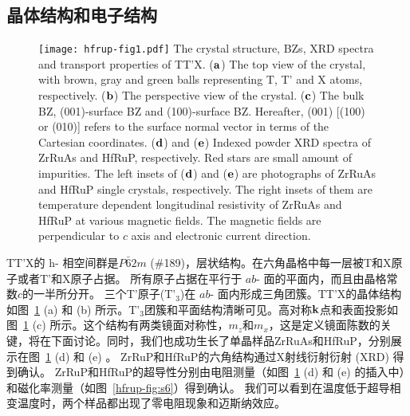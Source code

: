 \subsection{晶体结构和电子结构}
\begin{figure}[!htbp]
    \centering
    \texttt{[image: hfrup-fig1.pdf]}
     {The crystal structure, BZs, XRD spectra and transport properties of TT'X.
      ($\bold a$) The top view of the crystal, with brown, gray and green balls representing T, T' and X atoms, respectively.
      ($\bold b$) The perspective view of the crystal. 
      ($\bold c$) The bulk BZ, (001)-surface BZ and (100)-surface BZ. Hereafter, (001) [(100) or (010)] refers to the surface normal vector in terms of the Cartesian coordinates.
      ($\bold d$) and ($\bold e$) Indexed powder XRD spectra of ZrRuAs and HfRuP, respectively. Red stars are small amount of impurities. The left insets of ($\bold d$) and ($\bold e$) are photographs of ZrRuAs and HfRuP single crystals, respectively.  The right insets of them are temperature dependent longitudinal resistivity of ZrRuAs and HfRuP at various magnetic fields. The magnetic fields are perpendicular to $c$ axis and electronic current direction. ~\citep{qian2019npj}
      }
      \label{fig:4-1}
\end{figure}


TT'X的 h- 相空间群是$P\bar 6 2m$ (\#189)，层状结构。在六角晶格中每一层被T和X原子或者T'和X原子占据。
所有原子占据在平行于 $ab$- 面的平面内，而且由晶格常数$c$的一半所分开。
三个T'原子(T'$_3$)在 $ab$- 面内形成三角团簇。TT'X的晶体结构如图~\ref{fig:4-1} (a) 和 (b) 所示。T'$_3$团簇和平面结构清晰可见。高对称$\bold{k}$点和表面投影如图~\ref{fig:4-1} (c) 所示。这个结构有两类镜面对称性，$m_z$和$m_x$，这是定义镜面陈数的关键，将在下面讨论。同时，我们也成功生长了单晶样品ZrRuAs和HfRuP，分别展示在图~\ref{fig:4-1} (d) 和 (e) 。 ZrRuP和HfRuP的六角结构通过X射线衍射衍射 (XRD) 得到确认。
ZrRuP和HfRuP的超导性分别由电阻测量（如图~\ref{fig:4-1} (d) 和 (e) 的插入中）和磁化率测量（如图~\ref{hfrup-fig:s6}）得到确认。
我们可以看到在温度低于超导相变温度时，两个样品都出现了零电阻现象和迈斯纳效应。


